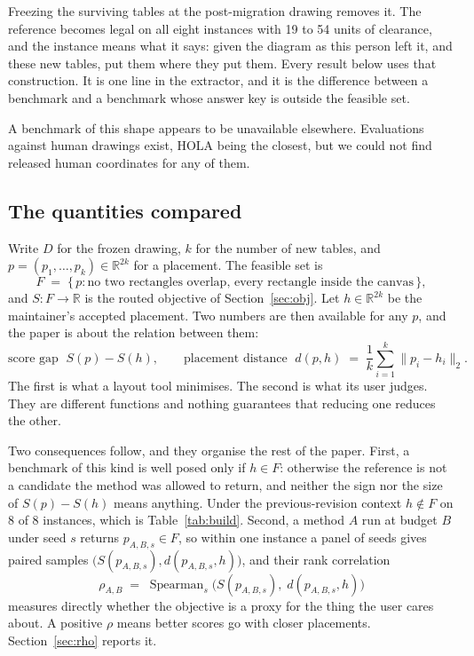 \documentclass[11pt]{article}
\begin{document}
Freezing the surviving tables at the post-migration drawing removes it. The reference becomes
legal on all eight instances with 19 to 54 units of clearance, and the instance means what it
says: given the diagram as this person left it, and these new tables, put them where they put
them. Every result below uses that construction. It is one line in the extractor, and it is the
difference between a benchmark and a benchmark whose answer key is outside the feasible set.

A benchmark of this shape appears to be unavailable elsewhere. Evaluations against human
drawings exist, HOLA \cite{hola16} being the closest, but we could not find released human
coordinates for any of them.

\subsection*{The quantities compared}

Write $D$ for the frozen drawing, $k$ for the number of new tables, and
$p = (p_1, \dots, p_k) \in \mathbb{R}^{2k}$ for a placement. The feasible set is
\[
F \;=\; \{\, p : \text{no two rectangles overlap, every rectangle inside the canvas} \,\},
\]
and $S : F \to \mathbb{R}$ is the routed objective of Section~\ref{sec:obj}. Let
$h \in \mathbb{R}^{2k}$ be the maintainer's accepted placement. Two numbers are then available
for any $p$, and the paper is about the relation between them:
\[
\text{score gap } \; S(p) - S(h),
\qquad
\text{placement distance } \; d(p,h) \;=\; \frac{1}{k}\sum_{i=1}^{k} \lVert p_i - h_i \rVert_2 .
\]
The first is what a layout tool minimises. The second is what its user judges. They are different
functions and nothing guarantees that reducing one reduces the other.

Two consequences follow, and they organise the rest of the paper. First, a benchmark of this
kind is well posed only if $h \in F$: otherwise the reference is not a candidate the method was
allowed to return, and neither the sign nor the size of $S(p) - S(h)$ means anything. Under the
previous-revision context $h \notin F$ on 8 of 8 instances, which is Table~\ref{tab:build}.
Second, a method $A$ run at budget $B$ under seed $s$ returns $p_{A,B,s} \in F$, so within one
instance a panel of seeds gives paired samples $\bigl(S(p_{A,B,s}), d(p_{A,B,s},h)\bigr)$, and
their rank correlation
\[
\rho_{A,B} \;=\; \operatorname{Spearman}_s\bigl(S(p_{A,B,s}),\; d(p_{A,B,s},h)\bigr)
\]
measures directly whether the objective is a proxy for the thing the user cares about. A
positive $\rho$ means better scores go with closer placements. Section~\ref{sec:rho} reports it.
\end{document}
